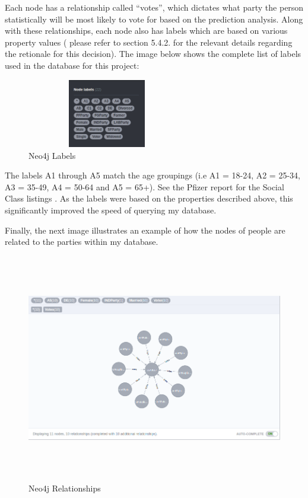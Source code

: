 Each node has a relationship called “votes”, which dictates what party the person statistically will be most likely to vote for based on the prediction analysis. Along with these relationships, each node also has labels which are based on various property values ( please refer to section 5.4.2. for the relevant details regarding the retionale for this decision). The image below shows the complete list of labels used in the database for this project:
\begin{figure}[h]
	\caption{Neo4j Labels}
	\centering
	\includegraphics[width=7cm, height=3cm]{img/neo4j-labels}
\end{figure}
\linebreak

The labels A1 through A5 match the age groupings (i.e A1 = 18-24, A2 = 25-34, A3 = 35-49, A4 = 50-64 and A5 = 65+). See the Pfizer report for the Social Class listings \cite{pfizer}. As the labels were based on the properties described above, this significantly improved the speed of querying my database. 
\pagebreak

Finally, the next image illustrates an example of how the nodes of people are related to the parties within my database. 
\begin{figure}[h]
	\caption{Neo4j Relationships}
	\centering
	\includegraphics[width=15cm, height=10cm]{img/neo4-relationships}
\end{figure}
\pagebreak

